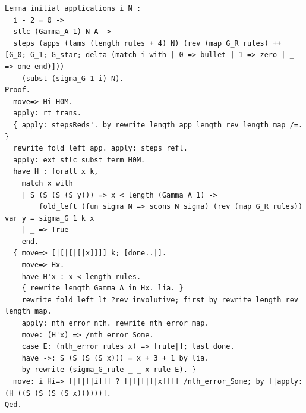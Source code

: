 \begin{lstlisting}
Lemma initial_applications i N :
  i - 2 = 0 ->
  stlc (Gamma_A 1) N A ->
  steps (apps (lams (length rules + 4) N) (rev (map G_R rules) ++ [G_0; G_1; G_star; delta (match i with | 0 => bullet | 1 => zero | _ => one end)]))
    (subst (sigma_G 1 i) N).
Proof.
  move=> Hi H0M.
  apply: rt_trans.
  { apply: stepsReds'. by rewrite length_app length_rev length_map /=. }
  rewrite fold_left_app. apply: steps_refl.
  apply: ext_stlc_subst_term H0M.
  have H : forall x k,
    match x with
    | S (S (S (S y))) => x < length (Gamma_A 1) ->
        fold_left (fun sigma N => scons N sigma) (rev (map G_R rules)) var y = sigma_G 1 k x
    | _ => True
    end.
  { move=> [|[|[|[|x]]]] k; [done..|].
    move=> Hx.
    have H'x : x < length rules.
    { rewrite length_Gamma_A in Hx. lia. }
    rewrite fold_left_lt ?rev_involutive; first by rewrite length_rev length_map.
    apply: nth_error_nth. rewrite nth_error_map.
    move: (H'x) => /nth_error_Some.
    case E: (nth_error rules x) => [rule|]; last done.
    have ->: S (S (S (S x))) = x + 3 + 1 by lia.
    by rewrite (sigma_G_rule _ _ x rule E). }
  move: i Hi=> [|[|[|i]]] ? [|[|[|[|x]]]] /nth_error_Some; by [|apply: (H ((S (S (S (S x))))))].
Qed.


\end{lstlisting}
